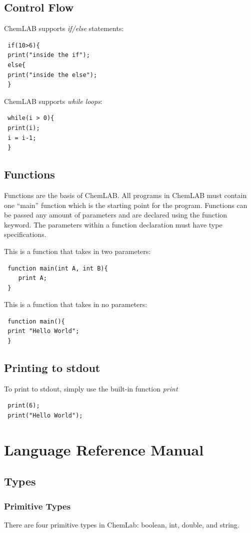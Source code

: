 \documentclass[11pt]{report}
\begin{document}
\section{Control Flow}
ChemLAB supports \emph{if/else} statements: 
 \begin{verbatim}
 if(10>6){
 print("inside the if");
 else{
 print("inside the else");
 }
 \end{verbatim}
 
ChemLAB supports \emph{while loops}:
 \begin{verbatim}
 while(i > 0){
 print(i);
 i = i-1;
 }
 \end{verbatim}
 
\section{Functions}
Functions are the basis of ChemLAB. All programs in ChemLAB must contain one ``main'' function which is the starting point for the program. Functions can be passed any amount of parameters and are declared using the function keyword. The parameters within a function declaration must have type specifications. 

This is a function that takes in two parameters:
 \begin{verbatim}
 function main(int A, int B){
 	print A;
 }
 \end{verbatim}
 
This is a function that takes in no parameters:
 \begin{verbatim}
 function main(){
 print "Hello World";
 }
 \end{verbatim}

\section{Printing to stdout}

To print to stdout, simply use the built-in function \emph{print}
\begin{verbatim}
 print(6);
 print("Hello World");
\end{verbatim}

\chapter{Language Reference Manual}
\section{Types}
\subsection{Primitive Types}
There are four primitive types in ChemLab: boolean, int, double, and string.
\end{document}
